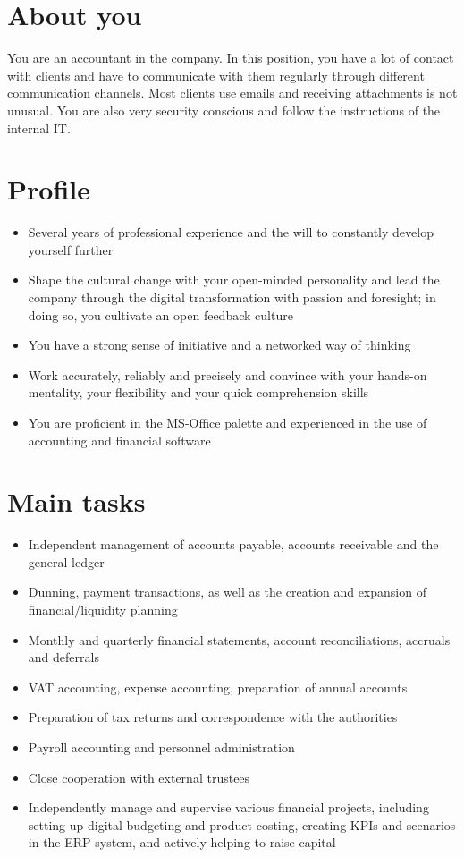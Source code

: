 \section*{About you}
You are an accountant in the company. 
In this position, you have a lot of contact with clients and have to communicate with them regularly through different communication channels. 
Most clients use emails and receiving attachments is not unusual. 
You are also very security conscious and follow the instructions of the internal IT.


\section*{Profile}
\begin{itemize}
    \item Several years of professional experience and the will to constantly develop yourself further
    \item Shape the cultural change with your open-minded personality and lead the company through the digital transformation with passion and foresight; in doing so, you cultivate an open feedback culture
    \item You have a strong sense of initiative and a networked way of thinking
    \item Work accurately, reliably and precisely and convince with your hands-on mentality, your flexibility and your quick comprehension skills
    \item You are proficient in the MS-Office palette and experienced in the use of accounting and financial software
\end{itemize}

\section*{Main tasks}
\begin{itemize}
    \item Independent management of accounts payable, accounts receivable and the general ledger
    \item Dunning, payment transactions, as well as the creation and expansion of financial/liquidity planning
    \item Monthly and quarterly financial statements, account reconciliations, accruals and deferrals
    \item VAT accounting, expense accounting, preparation of annual accounts
    \item Preparation of tax returns and correspondence with the authorities
    \item Payroll accounting and personnel administration
    \item Close cooperation with external trustees
    \item Independently manage and supervise various financial projects, including setting up digital budgeting and product costing, creating KPIs and scenarios in the ERP system, and actively helping to raise capital
\end{itemize}